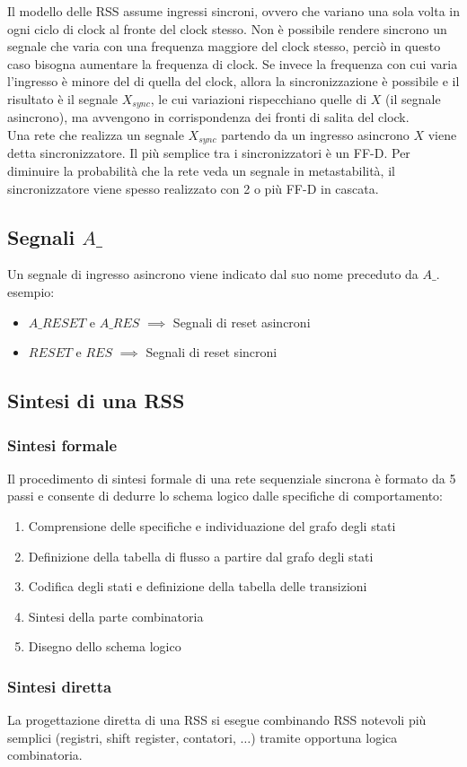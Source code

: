 \documentclass{subfiles}
\begin{document}
Il modello delle RSS assume ingressi sincroni, ovvero che variano una sola volta in ogni ciclo di clock al fronte del clock stesso.
Non è possibile rendere sincrono un segnale che varia con una frequenza maggiore del clock stesso, perciò in questo caso bisogna aumentare la frequenza di clock.
Se invece la frequenza con cui varia l'ingresso è minore del di quella del clock, allora la sincronizzazione è possibile e il risultato è il segnale $X_{sync}$, le cui variazioni rispecchiano quelle di $X$ (il segnale asincrono), ma avvengono in corrispondenza dei fronti di salita del clock.\\

\noindent
Una rete che realizza un segnale $X_{sync}$ partendo da un ingresso asincrono $X$ viene detta sincronizzatore.
Il più semplice tra i sincronizzatori è un FF-D.
Per diminuire la probabilità che la rete veda un segnale in metastabilità, il sincronizzatore viene spesso realizzato con 2 o più FF-D in cascata.

\subsection{Segnali $A\_$}

Un segnale di ingresso asincrono viene indicato dal suo nome preceduto da $A\_$.\\

\noindent
esempio:

\begin{itemize}
    \item $A\_RESET$ e $A\_RES$ $\implies$ Segnali di reset asincroni
    \item $RESET$ e $RES$ $\implies$ Segnali di reset sincroni
\end{itemize}

\subsection{Sintesi di una RSS}

\subsubsection{Sintesi formale}

Il procedimento di sintesi formale di una rete sequenziale sincrona è formato da 5 passi e consente di dedurre lo schema logico dalle specifiche di comportamento:

\begin{enumerate}
    \item Comprensione delle specifiche e individuazione del grafo degli stati
    \item Definizione della tabella di flusso a partire dal grafo degli stati
    \item Codifica degli stati e definizione della tabella delle transizioni
    \item Sintesi della parte combinatoria
    \item Disegno dello schema logico
\end{enumerate}

\subsubsection{Sintesi diretta}

La progettazione diretta di una RSS si esegue combinando RSS notevoli più semplici (registri, shift register, contatori, $\dots$) tramite opportuna logica combinatoria.
\end{document}
